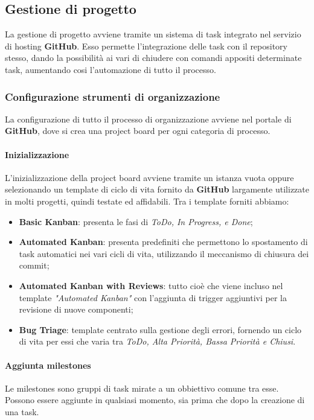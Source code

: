 \subsection{Gestione di progetto}
La gestione di progetto avviene tramite un sistema di task integrato nel servizio di hosting \textbf{GitHub}. 
Esso permette l'integrazione delle task con il repository stesso, dando la possibilità ai vari  di chiudere con comandi appositi determinate task, 
aumentando cosi l'automazione di tutto il processo. 

\subsubsection{Configurazione strumenti di organizzazione}
	La configurazione di tutto il processo di organizzazione avviene nel portale di \textbf{GitHub}, dove si crea una project board per ogni categoria di processo. 	

	\paragraph{Inizializzazione}
	L'inizializzazione della project board avviene tramite un istanza vuota oppure selezionando un template di ciclo di vita fornito da \textbf{GitHub} 
	largamente utilizzate in molti progetti, quindi testate ed affidabili. Tra i template forniti abbiamo: 

	\begin{itemize}
		\item \textbf{Basic Kanban}: presenta le fasi di \textit{ToDo, In Progress, e Done}; 
		\item \textbf{Automated Kanban}: presenta  predefiniti che permettono lo spostamento di task automatici nei vari cicli di vita, utilizzando il meccanismo di chiusura 
		dei commit;
		\item \textbf{Automated Kanban with Reviews}: tutto cioè che viene incluso nel template \textit{"Automated Kanban"} con l'aggiunta di trigger 
		aggiuntivi per la revisione di nuove componenti; 
		\item \textbf{Bug Triage}: template centrato sulla gestione degli errori, fornendo un ciclo di vita per essi che varia tra \textit{ToDo, Alta Priorità, Bassa Priorità e Chiusi}. 
	\end{itemize}
	  	
	\paragraph{Aggiunta milestones}
	Le milestones sono gruppi di task mirate a un obbiettivo comune tra esse.
	Possono essere aggiunte in qualsiasi momento, sia prima che dopo la creazione di una task.

